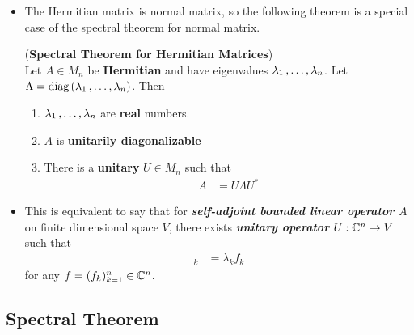 \documentclass[11pt]{article}
\begin{document}
\begin{itemize}
\item The Hermitian matrix is normal matrix, so the following theorem is a special case of the spectral theorem for normal matrix.
\begin{theorem} (\textbf{Spectral Theorem for Hermitian Matrices})  \citep{horn2012matrix}\\
Let $A \in M_n$ be \textbf{Hermitian} and have eigenvalues $\lambda_1 \,{,}\ldots{,}\, \lambda_n$. Let $\Lambda = \text{diag}\left(\lambda_1 \,{,}\ldots{,}\, \lambda_n\right)$. Then
\begin{enumerate}
\item $\lambda_1 \,{,}\ldots{,}\, \lambda_n$ are \textbf{real} numbers.
\item $A$ is \textbf{unitarily diagonalizable}
\item There is a \textbf{unitary} $U \in M_n$ such that 
\begin{align*}
A &= U \Lambda U^{*}
\end{align*} 
\end{enumerate}
\end{theorem}

\item \begin{remark}
This is equivalent to say that for \emph{\textbf{self-adjoint bounded linear operator $A$}} on finite dimensional space $V$, there exists \emph{\textbf{unitary operator} $U: {\mathbb C}^n  \rightarrow V$} such that 
\begin{align*}
[U^{-1} A U f]_k &= \lambda_k f_k
\end{align*} for any $f = (f_k)_{k=1}^{n} \in {\mathbb C}^n$.
\end{remark}
\end{itemize}

\subsection{Spectral Theorem}
\end{document}
